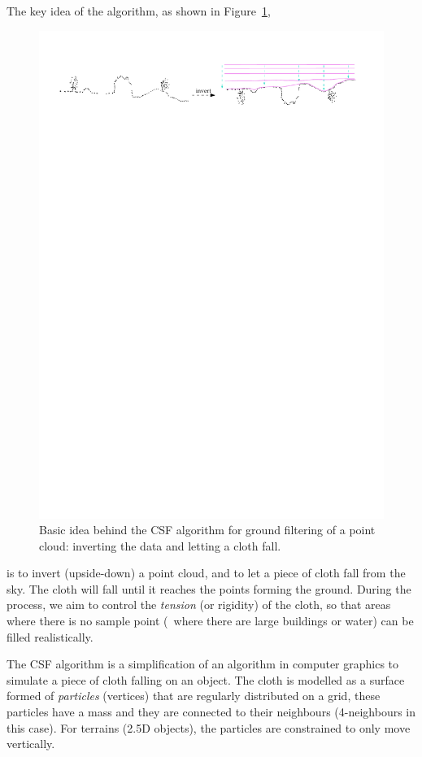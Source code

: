 The key idea of the algorithm, as shown in Figure~\ref{fig:csf_idea},
\begin{figure}
  \centering
  \includegraphics[width=\linewidth]{csf_idea}
  \caption{Basic idea behind the CSF algorithm for ground filtering of a point cloud: inverting the data and letting a cloth fall.}%
\label{fig:csf_idea}
\end{figure}
is to invert (upside-down) a point cloud, and to let a piece of cloth fall from the sky.
The cloth will fall until it reaches the points forming the ground.
During the process, we aim to control the \emph{tension} (or rigidity) of the cloth, so that areas where there is no sample point (\eg\ where there are large buildings or water) can be filled realistically.

%

The CSF algorithm is a simplification of an algorithm in computer graphics to simulate a piece of cloth falling on an object.
The cloth is modelled as a surface formed of \emph{particles} (vertices) that are regularly distributed on a grid, these particles have a mass and they are connected to their neighbours (4-neighbours in this case).
For terrains (2.5D objects), the particles are constrained to only move vertically.

